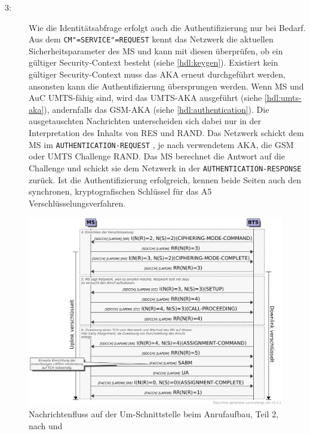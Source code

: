 \begin{description}
\item[3:] Wie die Identitätsabfrage erfolgt auch die Authentifizierung nur bei Bedarf. Aus dem \texttt{CM"=SERVICE"=REQUEST} kennt das Netzwerk die aktuellen Sicherheitsparameter des \ac{MS} und kann mit diesen überprüfen, ob ein gültiger Security-Context besteht (siehe \autoref{hdl:keygen}). Existiert kein gültiger Security-Context muss das \ac{AKA} erneut durchgeführt werden, ansonsten kann die Authentifizierung übersprungen werden. Wenn \ac{MS} und \ac{AuC} \ac{UMTS}-fähig sind, wird das \ac{UMTS}-\ac{AKA} ausgeführt (siehe \autoref{hdl:umts-aka}), andernfalls das \ac{GSM}-\ac{AKA} (siehe \autoref{hdl:authentication}). Die ausgetauschten Nachrichten unterscheiden sich dabei nur in der Interpretation des Inhalts von \ac{RES} und \ac{RAND}. Das Netzwerk schickt dem \ac{MS} im \texttt{AUTHENTICATION-REQUEST} \citep[Kap. 9.2.2]{3gpp:24.008}, je nach verwendetem \ac{AKA}, die \ac{GSM} oder \ac{UMTS} Challenge \ac{RAND}. Das \ac{MS} berechnet die Antwort auf die Challenge und schickt sie dem Netzwerk in der \texttt{AUTHENTICATION-RESPONSE} \citep[Kap. 9.2.2]{3gpp:24.008} zurück. Ist die Authentifizierung erfolgreich, kennen beide Seiten auch den synchronen, kryptografischen Schlüssel für das A5 Verschlüsselungsverfahren.
\end{description}

\begin{figure}[H]
	\centering \includegraphics[width=1.0\linewidth]{figures/mscgen/gsm_MOC_on_UM02.pdf}
	\caption[Nachrichtenfluss auf der Um-Schnittstelle beim Anrufaufbau, Teil 2]{Nachrichtenfluss auf der \ac{Um}-Schnittstelle beim Anrufaufbau, Teil 2, nach  und } \label{fig:moc-um-2}
\end{figure}

